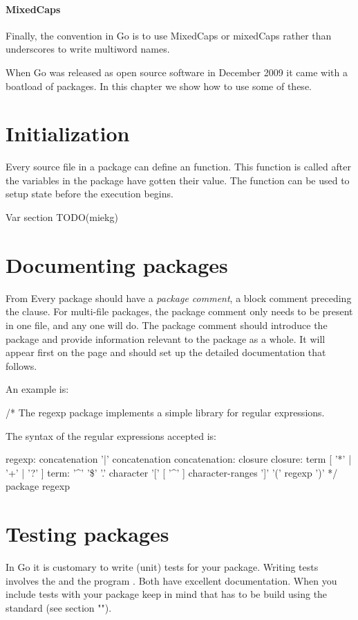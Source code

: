 \paragraph{MixedCaps}
Finally, the convention in Go is to use MixedCaps or mixedCaps rather
than underscores to write multiword names.

When Go was released as open source software in December 2009 it came
with a boatload of packages. In this chapter we show how to use some
of these.

\section{Initialization}
Every source file in a package can define an  function. This function is
called after the variables in the package have gotten their value. The
 function can be used to setup state before the execution
begins.

Var section TODO(miekg)

\section{Documenting packages}
From \cite{effective_go}
Every package should have a \emph{package comment}, a block comment preceding the
  clause. For multi-file packages, the package comment only needs to be
present in one file, and any one will do. The package comment should introduce
the package and provide information relevant to the package as a whole. It will
appear first on the  page and should set up the detailed documentation
that follows.

An example is:
\begin{display}
/*
    The regexp package implements a simple library for
    regular expressions.

    The syntax of the regular expressions accepted is:

    regexp:
        concatenation { '|' concatenation }
    concatenation:
        { closure }
    closure:
        term [ '*' | '+' | '?' ]
    term:
        '^'
        '\$'
        '.'
        character
        '[' [ '^' ] character-ranges ']'
        '(' regexp ')'
*/
package regexp
\end{display}





\section{Testing packages}
In Go it is customary to write (unit) tests for your package. Writing
tests involves the  and the program . Both
have excellent documentation. When you include tests with your package
keep in mind that has to be build using the standard 
(see section "").

